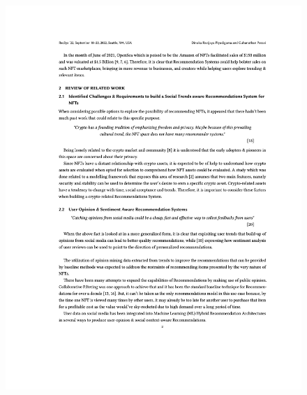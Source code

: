 \begin{figure}[h!]
\centering
\includegraphics[width=\textwidth]{images/appendix/papers/trends/Exploration of the possibility of infusing Social Media Trends into generating NFT Recommendations 2.jpeg}
\end{figure}

